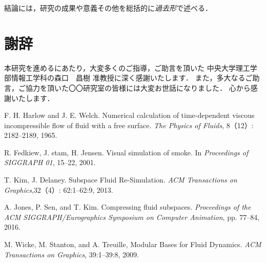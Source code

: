 \documentclass[a4j,12pt]{jreport}
\def\syaji{ \chapter*{謝辞} \addcontentsline{toc}{chapter}{謝辞}}
\begin{document}

結論には，研究の成果や意義その他を総括的に{\em 過去形}で述べる．



\syaji
\par
本研究を進めるにあたり，大変多くのご指導，ご助言を頂いた
中央大学理工学部情報工学科の森口　昌樹 准教授に深く感謝いたします．
また，多大なるご助言，ご協力を頂いた〇〇研究室の皆様には大変お世話になりました．
心から感謝いたします．


\begin{thebibliography}{99}
F. H. Harlow and J. E. Welch. Numerical calculation of time-dependent viscous incompressible flow of fluid with a free surface. \textit{The Physics of Fluids}, 8（12）: 2182--2189, 1965.

R. Fedkiew, J. stam, H. Jensen. Visual simulation of smoke. In \textit{Proceedings of SIGGRAPH 01}, 15--22, 2001.

T. Kim, J. Delaney. Subspace Fluid Re-Simulation. \textit{ACM Transactions on Graphics},32（4）: 62:1--62:9, 2013.

A. Jones, P. Sen, and T. Kim. Compressing fluid subspaces. \textit{Proceedings of the ACM SIGGRAPH/Eurographics Symposium on Computer Animation}, pp. 77--84, 2016.

M. Wicke, M. Stanton, and A. Treuille, Modular Bases for Fluid Dynamics. \textit{ACM Transactions on Graphics}, 39:1--39:8, 2009.

\end{thebibliography}

\end{document}

